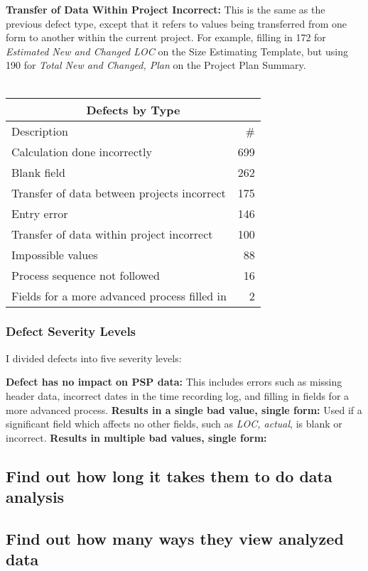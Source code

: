 {\bf Transfer of Data Within Project Incorrect:}
This is the same as the previous defect type, except that it refers to values
being transferred from one form to another within the current project.  For
example, filling in 172 for {\it Estimated New and Changed LOC} on the Size
Estimating Template, but using 190 for {\it Total New and Changed, Plan} on
the Project Plan Summary.\\ \\

\begin{tabular}{|l|r|}\hline
\multicolumn{2}{|c|}{\bf Defects by Type}\\ \hline
Description & \# \\ \hline\hline
Calculation done incorrectly                 & 699 \\ \hline
Blank field                                  & 262 \\ \hline
Transfer of data between projects incorrect  & 175 \\ \hline
Entry error                                  & 146 \\ \hline
Transfer of data within project incorrect    & 100 \\ \hline
Impossible values                            &  88 \\ \hline
Process sequence not followed                &  16 \\ \hline
Fields for a more advanced process filled in &   2 \\ \hline

\end{tabular}


\subsubsection{Defect Severity Levels}
I divided defects into five severity levels:\newline

{\bf Defect has no impact on PSP data:} This includes errors such as
missing header data, incorrect dates in the time recording log, and filling
in fields for a more advanced process.
{\bf Results in a single bad value, single form:} Used if a significant
field which affects no other fields, such as {\it LOC, actual},
is blank or incorrect. 
{\bf Results in multiple bad values, single form:}
{\bf}
{\bf}

\subsection{Find out how long it takes them to do data analysis}
\subsection{Find out how many ways they view analyzed data}












